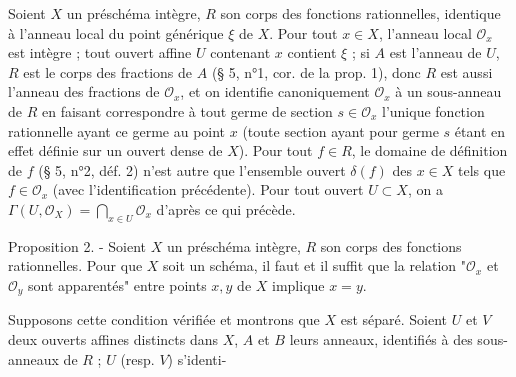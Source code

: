 Soient $X$ un préschéma intègre, $R$ son corps des fonctions rationnelles, identique à l'anneau local du point générique $\xi$ de $X$. Pour tout $x \in X$, l'anneau local $\mathcal{O}_x$ est intègre ; tout ouvert affine $U$ contenant $x$ contient $\xi$ ; si $A$ est l'anneau de $U$, $R$ est le corps des fractions de $A$ (§ 5, n°1, cor. de la prop. 1), donc $R$ est aussi l'anneau des fractions de $\mathcal{O}_x$, et on identifie canoniquement $\mathcal{O}_x$ à un sous-anneau de $R$ en faisant correspondre à tout germe de section $s \in \mathcal{O}_x$ l'unique fonction rationnelle ayant ce germe au point $x$ (toute section ayant pour germe $s$ étant en effet définie sur un ouvert dense de $X$). Pour tout $f \in R$, le domaine de définition de $f$ (§ 5, n°2, déf. 2) n'est autre que l'ensemble ouvert $\delta(f)$ des $x \in X$ tels que $f \in \mathcal{O}_x$ (avec l'identification précédente). Pour tout ouvert $U \subset X$, on a $\Gamma(U, \mathcal{O}_X) = \bigcap_{x \in U} \mathcal{O}_x$ d'après ce qui précède.

Proposition 2. - Soient $X$ un préschéma intègre, $R$ son corps des fonctions rationnelles. Pour que $X$ soit un schéma, il faut et il suffit que la relation "$\mathcal{O}_x$ et $\mathcal{O}_y$ sont apparentés" entre points $x, y$ de $X$ implique $x=y$.

Supposons cette condition vérifiée et montrons que $X$ est séparé. Soient $U$ et $V$ deux ouverts affines distincts dans $X$, $A$ et $B$ leurs anneaux, identifiés à des sous-anneaux de $R$ ; $U$ (resp. $V$) s'identi-

\newpage


